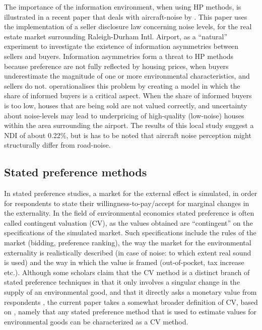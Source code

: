 \documentclass[a4paper]{scrartcl}
\begin{document}
The importance of the information environment, when using HP methods, is illustrated in a recent paper that deals with aircraft-noise by \cite{Pope2008}. This paper uses the implementation of a seller disclosure law concerning noise levels, for the real estate market surrounding Raleigh-Durham Intl. Airport, as a “natural” experiment to investigate the existence of information asymmetries between sellers and buyers.  Information asymmetries form a threat to HP methods because preference are not fully reflected by housing prices, when buyers underestimate the magnitude of one or more environmental characteristics, and sellers do not. \cite{Pope2008} operationalises this problem by creating a model in which the share of informed buyers is a critical aspect. When the share of informed buyers is too low, houses that are being sold are not valued correctly, and uncertainty about noise-levels may lead to underpricing of high-quality (low-noise) houses within the area surrounding the airport. The results of this local study suggest a NDI of about 0.22\%, but is has to be noted that aircraft noise perception might structurally differ from road-noise.

\subsection{Stated preference methods}

In stated preference studies, a market for the external effect is simulated, in order for respondents to state their willingness-to-pay/accept for marginal changes in the externality. In the field of environmental economics stated preference is often called contingent valuation (CV), as the values obtained are “contingent” on the specifications of the simulated market. Such specifications include the rules of the market (bidding, preference ranking), the way the market for the environmental externality is realistically described (in case of noise: to which extent real sound is used) and the way in which the value is framed (out-of-pocket, tax increase etc.)\citep{Carson2005}. Although some scholars claim that the CV method is a distinct branch of stated preference techniques in that it only involves a singular change in the supply of an environmental good, and that it directly asks a monetary value from respondents \citep{Wardman2004}, the current paper takes a somewhat broader definition of CV, based on \cite{Carson2005}, namely that any stated preference method that is used to estimate values for environmental goods can be characterized as a CV method.
\end{document}
